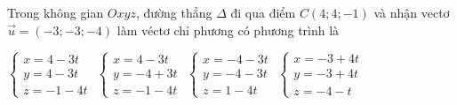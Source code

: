 \documentclass[12pt,a4paper]{article}
\begin{document}
\begin{ex}
 Trong không gian ${Oxyz}$, đường thẳng ${\Delta}$ đi qua điểm ${C(4;4;-1)}$ và nhận vectơ $\vec{u}=(-3;-3;-4)$ làm véctơ chỉ phương có phương trình là
 
\choice
{ \True $\left\{ \begin{array}{l}x = 4-3t\\ y = 4-3t\\z = -1-4t\end{array} \right.$ }
   { $\left\{ \begin{array}{l}x = 4-3t\\ y = -4+3t\\z = -1-4t\end{array} \right.$ }
     { $\left\{ \begin{array}{l}x = -4-3t\\ y = -4-3t\\z = 1-4t\end{array} \right.$ }
    { $\left\{ \begin{array}{l}x = -3+4t\\ y = -3+4t\\z = -4-t\end{array} \right.$ }
\end{ex}
\end{document}
